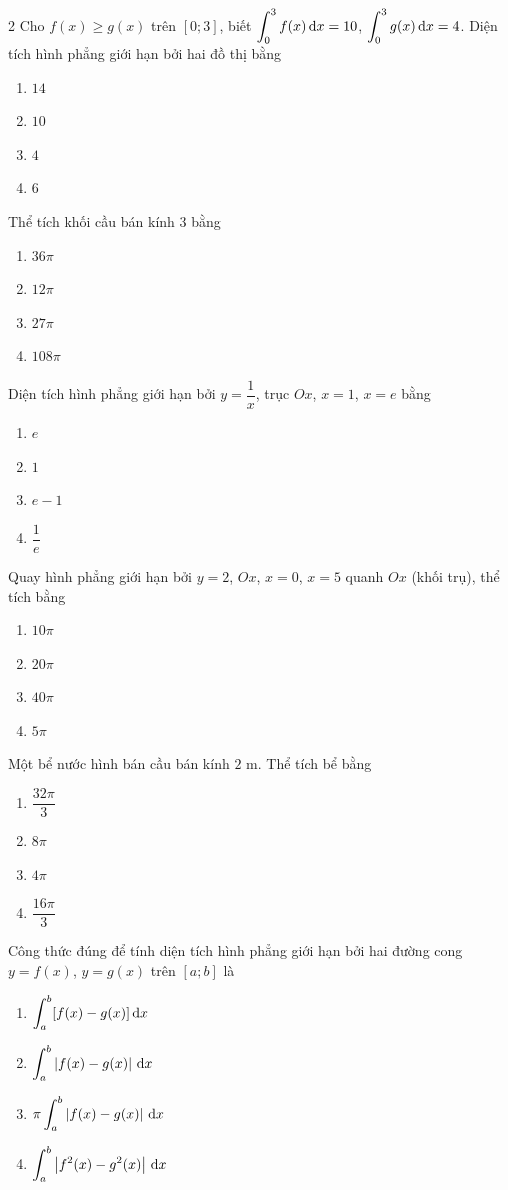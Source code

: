 \begin{multicols}{2}
\cauhoi Cho $f(x)\ge g(x)$ trên $[0;3]$, biết $\displaystyle\int_0^3 f(x)\,\mathrm{d}x=10$, $\displaystyle\int_0^3 g(x)\,\mathrm{d}x=4$. Diện tích hình phẳng giới hạn bởi hai đồ thị bằng
\begin{enumerate}[label=\textbf{\Alph*.}, leftmargin=0.9cm]
  \item $14$
  \item $10$
  \item $4$
  \item $6$
\end{enumerate}

\cauhoi Thể tích khối cầu bán kính $3$ bằng
\begin{enumerate}[label=\textbf{\Alph*.}, leftmargin=0.9cm]
  \item $36\pi$
  \item $12\pi$
  \item $27\pi$
  \item $108\pi$
\end{enumerate}

\cauhoi Diện tích hình phẳng giới hạn bởi $y=\dfrac1x$, trục $Ox$, $x=1$, $x=e$ bằng
\begin{enumerate}[label=\textbf{\Alph*.}, leftmargin=0.9cm]
  \item $e$
  \item $1$
  \item $e-1$
  \item $\dfrac1e$
\end{enumerate}

\cauhoi Quay hình phẳng giới hạn bởi $y=2$, $Ox$, $x=0$, $x=5$ quanh $Ox$ (khối trụ), thể tích bằng
\begin{enumerate}[label=\textbf{\Alph*.}, leftmargin=0.9cm]
  \item $10\pi$
  \item $20\pi$
  \item $40\pi$
  \item $5\pi$
\end{enumerate}

\cauhoi Một bể nước hình bán cầu bán kính $2$ m. Thể tích bể bằng
\begin{enumerate}[label=\textbf{\Alph*.}, leftmargin=0.9cm]
  \item $\dfrac{32\pi}{3}$
  \item $8\pi$
  \item $4\pi$
  \item $\dfrac{16\pi}{3}$
\end{enumerate}

\cauhoi Công thức đúng để tính diện tích hình phẳng giới hạn bởi hai đường cong $y=f(x)$, $y=g(x)$ trên $[a;b]$ là
\begin{enumerate}[label=\textbf{\Alph*.}, leftmargin=0.9cm]
  \item $\displaystyle\int_a^b[f(x)-g(x)]\,\mathrm{d}x$
  \item $\displaystyle\int_a^b\left| f(x)-g(x) \right|\,\mathrm{d}x$
  \item $\pi\displaystyle\int_a^b\left| f(x)-g(x) \right|\,\mathrm{d}x$
  \item $\displaystyle\int_a^b\left| f^2(x)-g^2(x) \right|\,\mathrm{d}x$
\end{enumerate}
\end{multicols}

